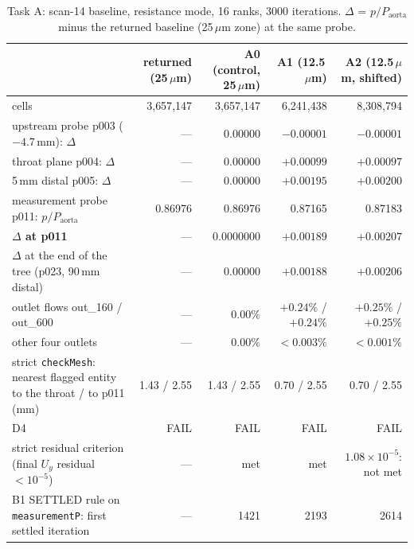 \documentclass[11pt]{article}
\begin{document}
\begin{table}[H]
\centering
\caption{\label{tab:taskA}Task A: scan-14 baseline, resistance mode, 16 ranks, 3000 iterations. $\Delta$ = $p/P_\text{aorta}$ minus the returned baseline (25\,$\mu$m zone) at the same probe.}
\small
\begin{tabular}{lrrrr}
\toprule
 & returned (25\,$\mu$m) & A0 (control, 25\,$\mu$m) & A1 (12.5\,$\mu$m) & A2 (12.5\,$\mu$m, shifted) \\
\midrule
cells & 3{,}657{,}147 & 3{,}657{,}147 & 6{,}241{,}438 & 8{,}308{,}794 \\
upstream probe p003 ($-4.7$\,mm): $\Delta$ & --- & $0.00000$ & $-0.00001$ & $-0.00001$ \\
throat plane p004: $\Delta$ & --- & $0.00000$ & $+0.00099$ & $+0.00097$ \\
5\,mm distal p005: $\Delta$ & --- & $0.00000$ & $+0.00195$ & $+0.00200$ \\
measurement probe p011: $p/P_\text{aorta}$ & 0.86976 & 0.86976 & 0.87165 & 0.87183 \\
\textbf{$\Delta$ at p011} & --- & $\mathbf{0.0000000}$ & $\mathbf{+0.00189}$ & $\mathbf{+0.00207}$ \\
$\Delta$ at the end of the tree (p023, 90\,mm distal) & --- & $0.00000$ & $+0.00188$ & $+0.00206$ \\
outlet flows out\_160 / out\_600 & --- & $0.00\%$ & $+0.24\%$ / $+0.24\%$ & $+0.25\%$ / $+0.25\%$ \\
other four outlets & --- & $0.00\%$ & $<0.003\%$ & $<0.001\%$ \\
strict \texttt{checkMesh}: nearest flagged entity to the throat / to p011 (mm) & 1.43 / 2.55 & 1.43 / 2.55 & 0.70 / 2.55 & 0.70 / 2.55 \\
D4 & FAIL & FAIL & FAIL & FAIL \\
strict residual criterion (final $U_y$ residual $<10^{-5}$) & --- & met & met & $1.08\times10^{-5}$: not met \\
B1 SETTLED rule on \texttt{measurementP}: first settled iteration & --- & 1421 & 2193 & 2614 \\
\bottomrule
\end{tabular}
\end{table}
\end{document}
